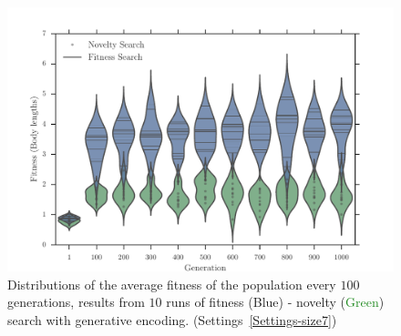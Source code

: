\begin{figure}[t!]
\centering
\includegraphics[width=1.0\textwidth]{../Figures/Results/ViolinPlotsAvgGenFitSize7.pdf}
\caption{Distributions of the average fitness of the population every $100$ generations, results from $10$ runs of fitness (\textcolor{NavyBlue}{Blue}) - novelty (\textcolor{ForestGreen}{Green}) search with generative encoding. (Settings~\ref{Settings-size7})}
\label{fig:ViolinPlotsAvgGenFitSize7}
\end{figure}

